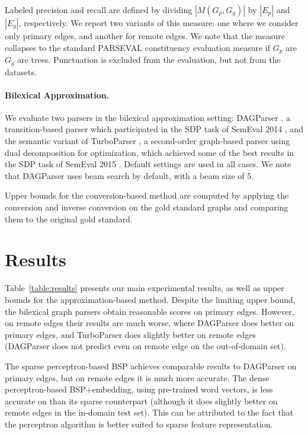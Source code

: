 \documentclass[11pt]{article}
\newcommand{\tabref}[1]{Table~\ref{#1}}
\begin{document}
\vspace{-.6cm}

Labeled precision and recall are defined by dividing $|M(G_p,G_g)|$ by $|E_p|$ and $|E_g|$, respectively.
We report two variants of this measure: one where we consider only primary edges,
and another for remote edges. We note that the measure collapses to the standard
PARSEVAL constituency evaluation measure if $G_p$ are $G_g$ are trees.
Punctuation is excluded from the evaluation, but not from the datasets.

\paragraph{Bilexical Approximation.}
We evaluate two parsers in the bilexical approximation setting:
DAGParser \cite{ribeyre-villemontedelaclergerie-seddah:2014:SemEval}, a transition-based parser
which participated in the SDP task of SemEval 2014 \cite{oepen2014semeval},
and the semantic variant of TurboParser \cite{almeida-martins:2015:SemEval},
a second-order graph-based parser using
dual decomposition for optimization, which achieved some of the best results
in the SDP task of SemEval 2015 \cite{oepen2015semeval}.
Default settings are used in all cases.
We note that DAGParser uses beam search by default, with a beam size of 5.

Upper bounds for the conversion-based method are computed by applying
the conversion and inverse conversion on the gold standard
graphs and comparing them to the original gold standard.

\section{Results}\label{sec:results}

\tabref{table:results} presents our main experimental results, as well as
upper bounds for the approximation-based method.
Despite the limiting upper bound, the bilexical graph parsers obtain reasonable scores on
primary edges. However, on remote edges their results are much worse, where
DAGParser \cite{ribeyre-villemontedelaclergerie-seddah:2014:SemEval} does better on primary edges,
and TurboParser \cite{almeida-martins:2015:SemEval} does slightly better on remote edges
(DAGParser does not predict even on remote edge on the out-of-domain set).

The sparse perceptron-based BSP achieves comparable results to DAGParser on primary edges, but
on remote edges it is much more accurate.
The dense perceptron-based BSP+embedding, using pre-trained word vectors, is less accurate on
than its sparse counterpart (although it does slightly better on remote edges in the in-domain
test set). This can be attributed to the fact that the perceptron algorithm is better suited to
sparse feature representation.
\end{document}
